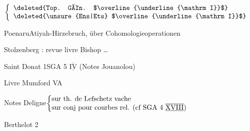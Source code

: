 

\qquad {}\ \(\left\{\begin{array}{l}\text{\deleted{Top. Gén. $\overline{\underline{\mathrm I}}$}}\\\text{\deleted{\unsure{Ens|Ets} $\overline{\underline{\mathrm I}}$}}\end{array}\right.\)

Poenaru\qquad Atiyah-Hirzebruch, über Cohomologieoperationen\unsure{-|\ldots} \unsure{---|\ldots}

Stolzenberg : revue livre Bishop \ldots



Saint Donat 1\qquad SGA 5 $\overline{\underline{\mathrm{IV}}}$ (Notes Jouanolou)


Livre Mumford VA

Notes Deligne\qquad \(\left\{\begin{array}{@{}p{.67\linewidth}@{}}sur th. de Lefschetz vache\\sur conj pour courbes rel. (cf SGA 4 $\overline{\underline{\mathrm{XVIII}}}$)\end{array}\right.\)

\clearpage

\reversemarginpar
Berthelot 2


